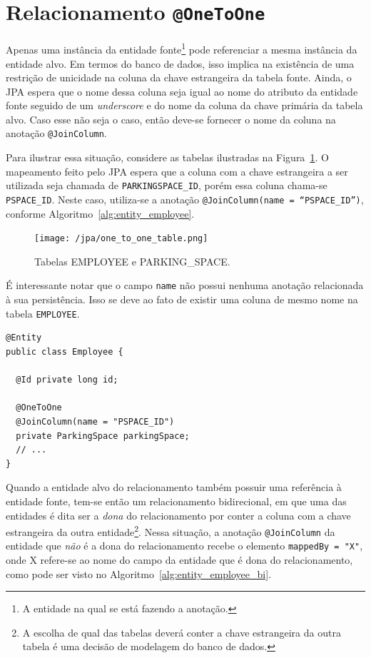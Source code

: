\documentclass[
  10.5pt,				  %
	openright,			%
	twoside,			  %
  a5paper,
  chapter=TITLE,	%
	section=TITLE,	%
  hyphens,        %
	english,        %
	brazil          %
]{abntex2}
\begin{document}
\section{Relacionamento \texttt{@OneToOne}}
Apenas uma instância da entidade fonte\footnote{A entidade na qual se está fazendo a anotação.} pode referenciar a mesma instância da entidade alvo. Em termos do banco de dados, isso implica na existência de uma restrição de unicidade na coluna da chave estrangeira da tabela fonte. Ainda, o JPA espera que o nome dessa coluna seja igual ao nome do atributo da entidade fonte seguido de um \emph{underscore} e do nome da coluna da chave primária da tabela alvo. Caso esse não seja o caso, então deve-se fornecer o nome da coluna na anotação \texttt{@JoinColumn}.

Para ilustrar essa situação, considere as tabelas ilustradas na Figura~\ref{fig:jpa_onetoone}. O mapeamento feito pelo JPA espera que a coluna com a chave estrangeira a ser utilizada seja chamada de \texttt{PARKINGSPACE\_ID}, porém essa coluna chama-se \texttt{PSPACE\_ID}. Neste caso, utiliza-se a anotação \texttt{@JoinColumn(name = ``PSPACE\_ID'')}, conforme Algoritmo~\ref{alg:entity_employee}.



\begin{figure}[!ht]
  \caption{\label{fig:jpa_onetoone} Tabelas EMPLOYEE e PARKING\_SPACE.}
  \begin{center}
    \texttt{[image: /jpa/one\_to\_one\_table.png]}
  \end{center}
\end{figure}

É interessante notar que o campo \texttt{name} não possui nenhuma anotação relacionada à sua persistência. Isso se deve ao fato de existir uma coluna de mesmo nome na tabela \texttt{EMPLOYEE}.

\begin{lstlisting}[caption={Classe Employee e seus relacionamentos.}, label={alg:entity_employee}]
@Entity
public class Employee {

  @Id private long id;
  
  @OneToOne
  @JoinColumn(name = "PSPACE_ID")
  private ParkingSpace parkingSpace;
  // ...
}
\end{lstlisting}


Quando a entidade alvo do relacionamento também possuir uma referência à entidade fonte, tem-se então um relacionamento bidirecional, em que uma das entidades é dita ser a \emph{dona} do relacionamento por conter a coluna com a chave estrangeira da outra entidade\footnote{A escolha de qual das tabelas deverá conter a chave estrangeira da outra tabela é uma decisão de modelagem do banco de dados.}. Nessa situação, a anotação \texttt{@JoinColumn} da entidade que \emph{não} é a dona do relacionamento recebe o elemento \texttt{mappedBy = "X"}, onde X refere-se ao nome do campo da entidade que é dona do relacionamento, como pode ser visto no Algoritmo~\ref{alg:entity_employee_bi}.
\end{document}
